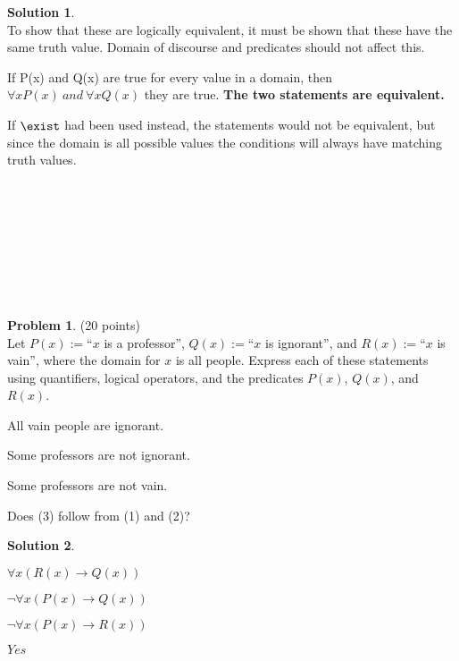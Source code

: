 \documentclass{article}
\theoremstyle{definition}
\newtheorem{problem}{Problem}
\newtheorem*{solution}{Solution}
\begin{document}
\begin{solution}\ \\
\indent To show that these are logically equivalent, it must be shown that these have the same truth value. Domain of discourse and predicates should not affect this. 

If P(x) and Q(x) are true for every value in a domain, then $\forall x P(x) \ and \ \forall x Q(x)$ they are true. \textbf{The two statements are equivalent.}

If $\exist$ had been used instead, the statements would not be equivalent, but since the domain is all possible values the conditions will always have matching truth values.
\end{solution}

\ \\
\ \\
\ \\
\\ \\ \\ \\ 
\begin{problem} (20 points)\\
Let $P(x):=$``$x$ is a professor'', $Q(x):=$``$x$ is ignorant'', and $R(x):=$``$x$ is vain'', where the domain for $x$ is all people.  Express each of these statements using quantifiers, logical operators, and the predicates $P(x)$, $Q(x)$, and $R(x)$.
\begin{compactenum}
\item All vain people are ignorant.
\item Some professors are not ignorant.
\item Some professors are not vain.
\item Does (3) follow from (1) and (2)?
\end{compactenum}
\end{problem}

\begin{solution}\ \\
\begin{compactenum}
\item $ \forall x (R(x) \to Q(x))$
\item $\neg \forall x (P(x)\to Q(x)) $
\item $\neg \forall x (P(x)\to R(x)) $
\item $Yes$
\end{compactenum}
\end{solution}
\end{document}
